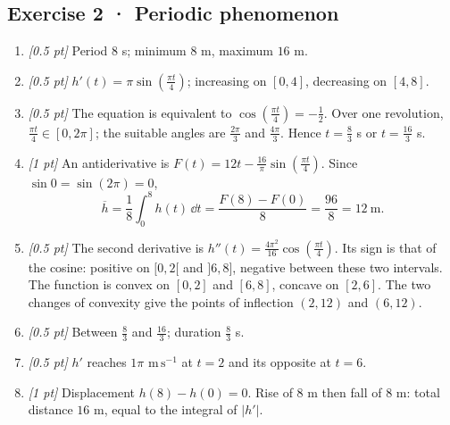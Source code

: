 \subsection*{Exercise 2 · Periodic phenomenon}\begin{enumerate}

\item \textit{[0.5 pt]} Period $8$ s; minimum $8$ m, maximum $16$ m.

\item \textit{[0.5 pt]} $h'(t)=\pi\sin (\frac{\pi t}{4})$; increasing on $[0,4]$, decreasing on $[4,8]$.

\item \textit{[0.5 pt]} The equation is equivalent to $\cos (\frac{\pi t}{4})=-\frac{1}{2}$. Over one revolution, $\frac{\pi t}{4}\in[0,2\pi]$; the suitable angles are $\frac{2\pi}{3}$ and $\frac{4\pi}{3}$. Hence $t=\frac{8}{3}$ s or $t=\frac{16}{3}$ s.

\item \textit{[1 pt]} An antiderivative is $F(t)=12t-\frac{16}{\pi}\sin (\frac{\pi t}{4})$. Since $\sin0=\sin(2\pi)=0$,
\[\overline h=\frac{1}{8}\int_0^{8}h(t)\,\dd t=\frac{F(8)-F(0)}{8}=\frac{96}{8}=12\ \mathrm{m}.\]

\item \textit{[0.5 pt]} The second derivative is $h''(t)=\frac{4\pi^2}{16}\cos (\frac{\pi t}{4})$. Its sign is that of the cosine: positive on $[0,2[$ and $]6,8]$, negative between these two intervals. The function is convex on $[0,2]$ and $[6,8]$, concave on $[2,6]$. The two changes of convexity give the points of inflection $(2,12)$ and $(6,12)$.

\item \textit{[0.5 pt]} Between $\frac{8}{3}$ and $\frac{16}{3}$; duration $\frac{8}{3}$ s.

\item \textit{[0.5 pt]} $h'$ reaches $1\pi$ $\mathrm{m\,s^{-1}}$ at $t=2$ and its opposite at $t=6$.

\item \textit{[1 pt]} Displacement $h(8)-h(0)=0$. Rise of $8$ m then fall of $8$ m: total distance $16$ m, equal to the integral of $|h'|$.

\end{enumerate}

